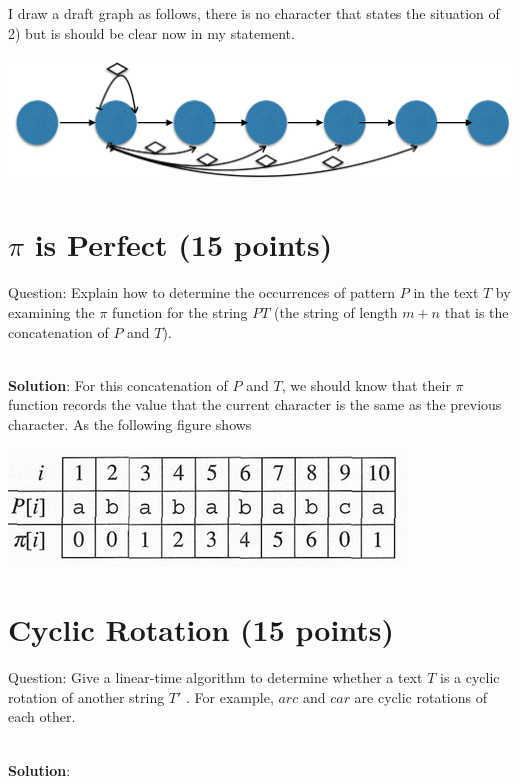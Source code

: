 \documentclass{article}
\begin{document}
I draw a draft graph as follows, there is no character that states the situation of 2) but is should be clear now in my statement.

\begin{center}
\includegraphics[scale=0.3]{hw7_3.png}
\end{center}


\section{$\pi$ is Perfect (15 points)}
Question: Explain how to determine the occurrences of pattern $P$ in the text $T$ by examining the $\pi$ function for the string $PT$ (the string of length $m+n$ that is the concatenation of $P$ and $T$).

~\\
\textbf{Solution}:\newline
\indent For this concatenation of $P$ and $T$, we should know that their $\pi$ function records the value that the current character is the same as the previous character. As the following figure shows 


\begin{center}
\includegraphics[scale=0.3]{hw7_5.png}
\end{center}


\section{Cyclic Rotation (15 points)}
Question: Give a linear-time algorithm to determine whether a text $T$ is a cyclic rotation of another string $T'$ . For example, $arc$ and $car$ are cyclic rotations of each other.

~\\
\textbf{Solution}:\newline
\indent
\end{document}
